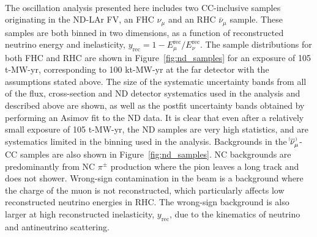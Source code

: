 \begin{figure*}
  \centering
  \\
  \caption{ND samples in both FHC and RHC, shown in the reconstructed neutrino energy and reconstructed inelasticity binning ($y_{\mathrm{rec}}$) used in the analysis, for a 105 t-MW-yr exposure (equivalent to a 100 kt-MW-yr exposure at the FD), with an equal split between FHC and RHC. The size of the systematic uncertainty bands from all of the flux, cross-section and ND detector systematics used in the analysis are shown, as well as the postfit uncertainty bands obtained by performing an Asimov fit to the ND data. NC backgrounds and wrong-sign contributions to the total event rate are also shown. Statistical uncertainties are too small to be visible on this plot scale.}
 \label{fig:nd_samples}
\end{figure*}
The oscillation analysis presented here includes two CC-inclusive samples originating in the ND-LAr FV, an FHC $\nu_{\mu}$ and an RHC $\bar{\nu}_{\mu}$ sample. These samples are both binned in two dimensions, as a function of reconstructed neutrino energy and inelasticity, $y_{\mathrm{rec}} = 1 - E^{\mathrm{rec}}_{\mu}/E^{\mathrm{rec}}_{\nu}$. The sample distributions for both FHC and RHC are shown in Figure~\ref{fig:nd_samples} for an exposure of 105 t-MW-yr, corresponding to 100 kt-MW-yr at the far detector with the assumptions stated above. The size of the systematic uncertainty bands from all of the flux, cross-section and ND detector systematics used in the analysis and described above are shown, as well as the postfit uncertainty bands obtained by performing an Asimov fit to the ND data. It is clear that even after a relatively small exposure of 105 t-MW-yr, the ND samples are very high statistics, and are systematics limited in the binning used in the analysis. Backgrounds in the $\nu^{\bracketbar}_{\mu}$-CC samples are also shown in Figure~\ref{fig:nd_samples}. NC backgrounds are predominantly from NC $\pi^{\pm}$ production where the pion leaves a long track and does not shower. Wrong-sign contamination in the beam is a background where the charge of the muon is not reconstructed, which particularly affects low reconstructed neutrino energies in RHC. The wrong-sign background is also larger at high reconstructed inelasticity, $y_{\mathrm{rec}}$, due to the kinematics of neutrino and antineutrino scattering.

